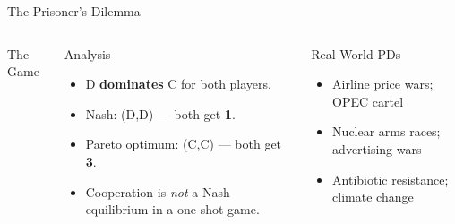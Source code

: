 \documentclass[aspectratio=169]{beamer}
\begin{document}
\begin{frame}{The Prisoner's Dilemma}
\begin{columns}
\begin{block}{The Game}
\begin{center}
\end{center}
\end{block}
\begin{block}{Analysis}
\begin{itemize}
  \item D \textbf{dominates} C for both players.
  \item Nash: (D,D) --- both get \textbf{1}.
  \item Pareto optimum: (C,C) --- both get \textbf{3}.
  \item Cooperation is \textit{not} a Nash equilibrium in a one-shot game.
\end{itemize}
\end{block}
\begin{alertblock}{Real-World PDs}
\begin{itemize}\small
  \item Airline price wars; OPEC cartel
  \item Nuclear arms races; advertising wars
  \item Antibiotic resistance; climate change
\end{itemize}
\end{alertblock}
\end{columns}
\end{frame}
\end{document}
